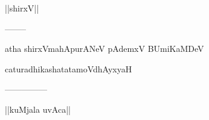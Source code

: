 \documentclass{article}
\begin{document}
\begin{center}
||shirxV||
\end{center}

\begin{center}
--------
\end{center}

\begin{center}
atha shirxVmahApurANeV pAdemxV BUmiKaMDeV
\end{center}

\begin{center}
caturadhikashatatamoVdhAyxyaH
\end{center}

\begin{center}
---------------
\end{center}

\begin{center}
||kuMjala uvAca||
\end{center}
\end{document}
